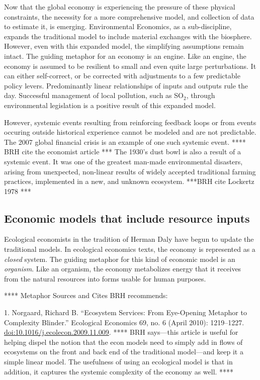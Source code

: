 Now that the global economy is experiencing the pressure of these physical constraints, 
the necessity for a more comprehensive model, and collection of data to estimate it,
is emerging. Environmental Economics, as a sub-discipline, expands the traditional model to include material exchanges with the biosphere. 
However, even with this expanded model, the simplifying assumptions remain intact. The guiding metaphor for 
an economy is an engine. Like an engine, the economy is  assumed 
to be resilient to small and even quite large perturbations.  It can either self-correct, or be corrected with adjustments to
a few predictable policy levers. Predominantly linear relationships of inputs and outputs rule the day. 
Successful management of  local pollution, such as SO$_2$, through environmental legislation
is a positive result of this expanded model.
 

However, systemic events resulting from reinforcing feedback loops or from events occuring
outside historical experience cannot be modeled and are not predictable. The 2007 global 
financial crisis is an example of one such systemic event. **** BRH cite the economist article ***
The 1930's dust bowl is also a result of a systemic event. It was one of the greatest man-made
environmental disasters, arising from unexpected, non-linear 
results of widely accepted traditional farming practices, 
implemented in a new, and unknown ecosystem. ***BRH cite Lockertz 1978 ***

\subsection{Economic models that include resource inputs}
\label{sec:metaphor_resource}

Ecological economists in the tradition of Herman Daly have begun to 
update the traditional models. In ecological economics texts, the economy is 
represented as a \emph{closed} system. The guiding metaphor for this kind of economic model is an \emph{organism}. Like an organism,
the economy metabolizes energy that it receives from the natural resources
 into forms usable for human purposes.
   

**** Metaphor Sources and Cites BRH recommends:


1. Norgaard, Richard B. “Ecosystem Services: From Eye-Opening Metaphor to Complexity Blinder.” Ecological Economics 69, no. 6 (April 2010): 1219--1227. \url{doi:10.1016/j.ecolecon.2009.11.009}. **** BRH says---this article is useful for helping dispel the notion that the econ models need to simply 
add in flows of ecosystems on the front and back end of the traditional model---and keep it a simple linear model. The usefulness
of using an ecological model is that in addition, it captures the systemic complexity of the economy as well. ****


